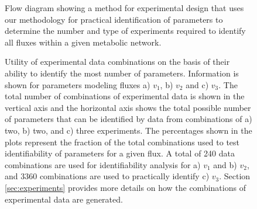 \documentclass[10pt]{article}
\begin{document}
	\begin{figure}[!tbhp]
		\caption{Flow diagram showing a method for experimental design that uses our methodology for practical identification of parameters to determine the number and type of experiments required to identify all fluxes within a given metabolic network.}\label{fig:ident-design}
	\end{figure}

	\begin{figure}[!tbhp]
		\caption{Utility of experimental data combinations on the basis of their ability to identify the most number of parameters. Information is shown for parameters modeling fluxes a) $v_1$, b) $v_2$ and c) $v_3$. The total number of combinations of experimental data is shown in the vertical axis and the horizontal axis shows the total possible number of parameters that can be identified by data from combinations of a) two, b) two, and c) three experiments. The percentages shown in the plots represent the fraction of the total combinations used to test identifiability of parameters for a given flux. A total of 240 data combinations are used for identifiability analysis for a) $v_1$ and b) $v_2$, and 3360 combinations are used to practically identify c) $v_3$. Section \ref{sec:experiments} provides more details on how the combinations of experimental data are generated.}\label{fig:data_utility}
	\end{figure}
	
\end{document}
